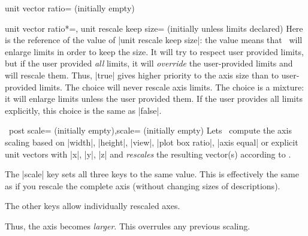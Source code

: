 \begin{pgfplotskey}{unit vector ratio= (initially empty)}
\begin{pgfplotskeylist}{%
		unit vector ratio*=,
		unit rescale keep size= (initially unless limits declared)}
	Here is the reference of the value of |unit rescale keep size|: the value  means that \PGFPlots\ will enlarge limits in order to keep the size. It will try to respect user provided limits, but if the user provided \emph{all} limits, it will \emph{override} the user-provided limits and will rescale them. Thus, |true| gives higher priority to the axis size than to user-provided limits. The choice  will never rescale axis limits. The choice  is a mixture: it will enlarge limits unless the user provided them. If the user provides all limits explicitly, this choice is the same as |false|.
	\end{pgfplotskeylist}
\end{pgfplotskey}

\begin{pgfplotsxykeylist}{\x\ post scale= (initially empty),scale= (initially empty)}
	Lets \PGFPlots\ compute the axis scaling based on |width|, |height|, |view|, |plot box ratio|, |axis equal| or explicit unit vectors with |x|, |y|, |z| and \emph{rescales} the resulting vector(s) according to .

	The |scale| key sets all three keys to the same  value.	This is effectively the same as if you rescale the complete axis (without changing sizes of descriptions).

	The other keys allow individually rescaled axes.
\begin{codeexample}[]
\end{codeexample}
	Thus, the axis becomes \emph{larger}. This overrules any previous scaling.

\begin{codeexample}[]
\end{codeexample}
\end{pgfplotsxykeylist}

